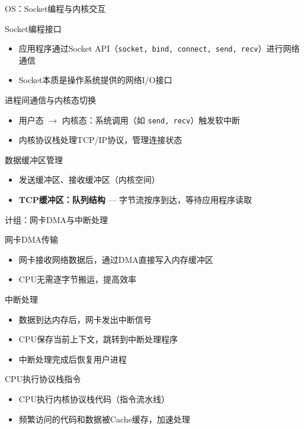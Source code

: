 \documentclass[10pt, aspectratio=169]{beamer}
\begin{document}
\begin{frame}{OS：Socket编程与内核交互}
    \begin{block}{Socket编程接口}
        \begin{itemize}
            \item 应用程序通过Socket API（\texttt{socket, bind, connect, send, recv}）进行网络通信
            \item Socket本质是操作系统提供的网络I/O接口
        \end{itemize}
    \end{block}
    \begin{block}{进程间通信与内核态切换}
        \begin{itemize}
            \item 用户态 $\to$ 内核态：系统调用（如 \texttt{send, recv}）触发软中断
            \item 内核协议栈处理TCP/IP协议，管理连接状态
        \end{itemize}
    \end{block}
    \begin{block}{数据缓冲区管理}
        \begin{itemize}
            \item 发送缓冲区、接收缓冲区（内核空间）
            \item \textbf{TCP缓冲区：队列结构} --- 字节流按序到达，等待应用程序读取
        \end{itemize}
    \end{block}
\end{frame}

\begin{frame}{计组：网卡DMA与中断处理}
    \begin{block}{网卡DMA传输}
        \begin{itemize}
            \item 网卡接收网络数据后，通过DMA直接写入内存缓冲区
            \item CPU无需逐字节搬运，提高效率
        \end{itemize}
    \end{block}
    \begin{block}{中断处理}
        \begin{itemize}
            \item 数据到达内存后，网卡发出中断信号
            \item CPU保存当前上下文，跳转到中断处理程序
            \item 中断处理完成后恢复用户进程
        \end{itemize}
    \end{block}
    \begin{block}{CPU执行协议栈指令}
        \begin{itemize}
            \item CPU执行内核协议栈代码（指令流水线）
            \item 频繁访问的代码和数据被Cache缓存，加速处理
        \end{itemize}
    \end{block}
\end{frame}
\end{document}
